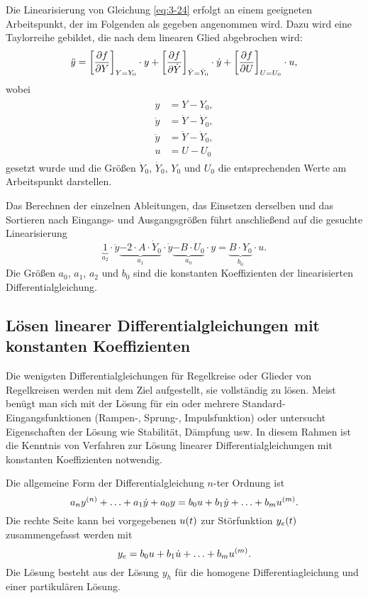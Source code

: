 Die Linearisierung von Gleichung \eqref{eq:3-24} erfolgt an einem geeigneten Arbeitspunkt, der im Folgenden als gegeben angenommen wird.
Dazu wird eine Taylorreihe gebildet, die nach dem linearen Glied abgebrochen wird:
\[
	\ddot{y} = \brackets*{\frac{\partial f}{\partial Y}}_{Y = Y_0} \cdot y + \brackets*{\frac{\partial f}{\partial\dot{Y}}}_{\dot{Y} = \dot{Y}_0} \cdot \dot{y} + \brackets*{\frac{\partial f}{\partial U}}_{U = U_0} \cdot u,
\]
wobei
\begin{align}
	\begin{split}
		y &= Y - Y_0,\\
		\dot{y} &= \dot{Y} - \dot{Y}_0,\\
		\ddot{y} &= \ddot{Y} - \ddot{Y}_0,\\
		u &= U - U_0
	\end{split}
\end{align}
gesetzt wurde und die Größen \(\ddot{Y}_0\), \(\dot{Y}_0\), \(Y_0\) und \(U_0\) die entsprechenden Werte am Arbeitspunkt darstellen.

Das Berechnen der einzelnen Ableitungen, das Einsetzen derselben und das Sortieren nach Eingangs- und Ausgangsgrößen führt anschließend auf die gesuchte Linearisierung
\begin{equation}
	\underbrace{1}_{a_2} \cdot \ddot{y} \underbrace{- 2 \cdot A \cdot \dot{Y}_0}_{a_1} \cdot \dot{y} \underbrace{- B \cdot U_0}_{a_0} \cdot y = \underbrace{B \cdot Y_0}_{b_0} \cdot u.
\end{equation}
Die Größen \(a_0\), \(a_1\), \(a_2\) und \(b_0\) sind die konstanten Koeffizienten der linearisierten Differentialgleichung.


\subsection{Lösen linearer Differentialgleichungen mit konstanten Koeffizienten}

Die wenigsten Differentialgleichungen für Regelkreise oder Glieder von Regelkreisen werden mit dem Ziel aufgestellt, sie vollständig zu lösen.
Meist benügt man sich mit der Lösung für ein oder mehrere Standard-Eingangsfunktionen (Rampen-, Sprung-, Impulsfunktion) oder untersucht Eigenschaften der Lösung wie Stabilität, Dämpfung usw.
In diesem Rahmen ist die Kenntnis von Verfahren zur Lösung linearer Differentialgleichungen mit konstanten Koeffizienten notwendig.

Die allgemeine Form der Differentialgleichung \(n\)-ter Ordnung ist
\begin{equation}
	a_n y^{\parentheses*{n}} + \ldots + a_1 \dot{y} + a_0 y = b_0 u + b_1 \dot{y} + \ldots + b_m u^{\parentheses*{m}}.
\end{equation}
Die rechte Seite kann bei vorgegebenen \(u\parentheses*{t}\) zur Störfunktion \(y_e\parentheses*{t}\) zusammengefasst werden mit
\begin{equation}
	y_e = b_0 u + b_1 \dot{u} + \ldots + b_m u^{\parentheses*{m}}.
\end{equation}
Die Lösung besteht aus der Lösung \(y_h\) für die homogene Differentiagleichung und einer partikulären Lösung.

